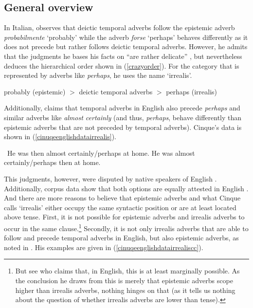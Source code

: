 \subsection{General overview}
In Italian, \citet[86--89]{cinque1999adverbs} observes that deictic temporal adverbs follow the epistemic adverb \textit{probabilmente} `probably' while the adverb \textit{forse} `perhaps' behaves differently as it does not precede but rather follows deictic temporal adverbs. However, he admits that the judgments he bases his facts on ``are rather delicate'' \citep[87]{cinque1999adverbs}, but nevertheless deduces the hierarchical order shown in (\ref{crazyorder}). For the category that is represented by adverbs like \textit{perhaps}, he uses the name `irrealis'.

\begin{exe} 
\ex probably (epistemic) $>$ deictic temporal adverbs $>$ perhaps (irrealis) \label{crazyorder}
\end{exe}  

\noindent Additionally, \citet[33]{cinque1999adverbs} claims that temporal adverbs in English also precede \textit{perhaps} and similar adverbs like \textit{almost certainly} (and thus, \textit{perhaps}, behave differently than epistemic adverbs that are not preceded by temporal adverbs). Cinque's data is shown in (\ref{cinuqeenglishdatairrealis}).

\begin{exe}
\ex\label{cinuqeenglishdatairrealis}\begin{xlist}
\ex \textcolor{white}{*}He was then almost certainly/perhaps at home.
\ex *He was almost certainly/perhaps then at home.
\end{xlist}
\end{exe}

\noindent This judgments, however, were disputed by native speakers of English \citep[32]{zyman2012two}. Additionally, corpus data show that both options are equally attested in English \citep[65--66]{nordstrom2010modality}. And there are more reasons to believe that epistemic adverbs and what Cinque calls `irrealis' either occupy the same syntactic position or are at least located above tense. First, it is not possible for epistemic adverbs and irrealis adverbs to occur in the same clause.\footnote{ But see \citet[32]{zyman2012two} who claims that, in English, this is at least marginally possible. As the conclusion he draws from this is merely that epistemic adverbs scope higher than irrealis adverbs, nothing hinges on that (as it tells us nothing about the question of whether irrealis adverbs are lower than tense). } Secondly, it is not only irrealis adverbs that are able to follow and precede temporal adverbs in English, but also epistemic adverbs, as noted in \citet[33]{cinque1999adverbs}. His examples are given in (\ref{cinuqeenglishdatairrealiscc}).

